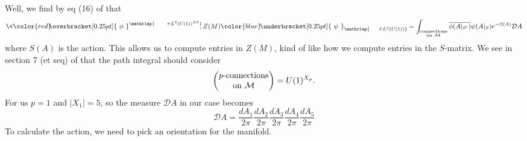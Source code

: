 Well, we find by eq (16) of \cite{Wise:2006kg} that
\begin{equation}%
\<{\color{red}\!\!\overbracket[0.25pt]{~\phi~}^{\mathrlap{\;\;\;\;\;\;\;\;\in L^{2}(U(1))^{\otimes 2}}}\!\!},Z(M){\color{blue}\!\underbracket[0.25pt]{\,\,\psi~}_{\mathrlap{\;\;\;\;\;\;\in L^{2}(U(1))}}\!\!}\> =
\int_{{\substack{\text{connections}\\\text{on $\mathcal{M}$}}}}\overline{\phi(A|_{S'})}\psi(A|_{S}) e^{-S(A)}\mathcal{D}A
\end{equation}
where $S(A)$ is the action. This allows us to compute entries in
$Z(M)$, kind of like how we compute entries in the $S$-matrix. We
see in section 7 (et seq) of \cite{Wise:2006kg} that the path integral
should consider
\begin{equation}%
\begin{pmatrix}p$-connections$\\
$on$\ \mathcal{M}\end{pmatrix}
=U(1)^{X_{p}}.
\end{equation}
For us $p=1$ and $|X_{1}|=5$, so the measure $\mathcal{D}A$ in
our case becomes
\begin{equation}%
\mathcal{D}A = \frac{dA_{1}}{2\pi}\frac{dA_{2}}{2\pi}\frac{dA_{3}}{2\pi}\frac{dA_{4}}{2\pi}\frac{dA_{5}}{2\pi}
\end{equation}
To calculate the action, we need to pick an orientation for the
manifold. 

